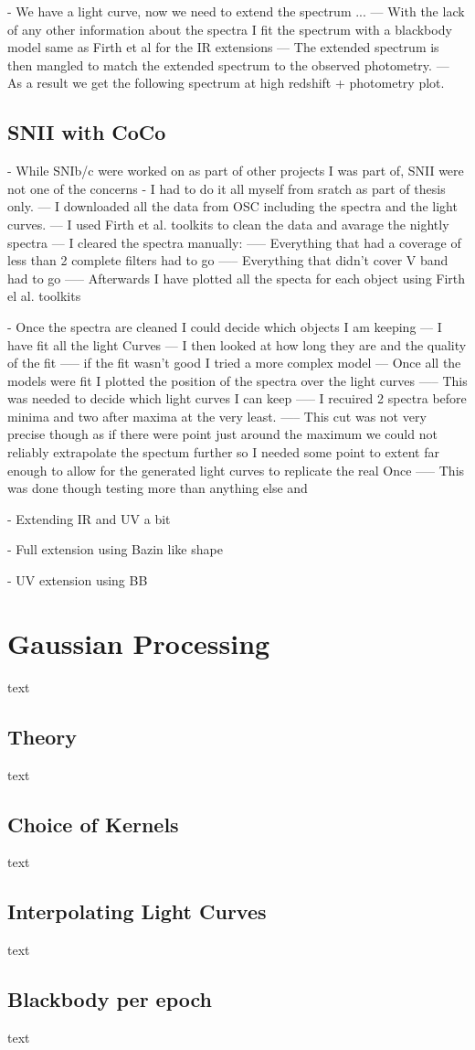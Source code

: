 - We have a light curve, now we need to extend the spectrum ...
--- With the lack of any other information about the spectra I fit the spectrum with a blackbody model same as Firth et al for the IR extensions
--- The extended spectrum is then mangled to match the extended spectrum to the observed photometry.
--- As a result we get the following spectrum at high redshift + photometry plot.

\subsection{SNII with CoCo}
- While SNIb/c were worked on as part of other projects I was part of, SNII were not one of the concerns
- I had to do it all myself from sratch as part of thesis only.
--- I downloaded all the data from OSC including the spectra and the light curves.
--- I used Firth et al. toolkits to clean the data and avarage the nightly spectra
--- I cleared the spectra manually:
----- Everything that had a coverage of less than 2 complete filters had to go
----- Everything that didn't cover V band had to go
----- Afterwards I have plotted all the specta for each object using Firth el al. toolkits

- Once the spectra are cleaned I could decide which objects I am keeping
--- I have fit all the light Curves
--- I then looked at how long they are and the quality of the fit
----- if the fit wasn't good I tried a more complex model
--- Once all the models were fit I plotted the position of the spectra over the light curves
----- This was needed to decide which light curves I can keep
----- I recuired 2 spectra before minima and two after maxima at the very least.
----- This cut was not very precise though as if there were point just around the maximum we could not reliably extrapolate the spectum further so I needed some point to extent far enough to allow for the generated light curves to replicate the real Once
----- This was done though testing more than anything else and

- Extending IR and UV a bit

- Full extension using Bazin like shape

- UV extension using BB

\section{Gaussian Processing}
text
\subsection{Theory}
text
\subsection{Choice of Kernels}
text
\subsection{Interpolating Light Curves}
text
\subsection{Blackbody per epoch}
text
